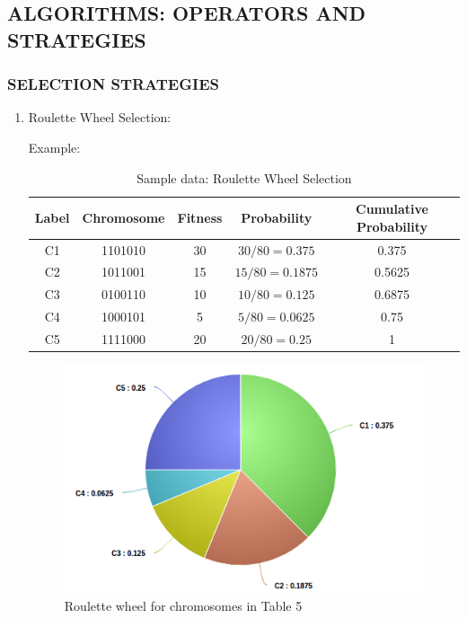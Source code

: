 \documentclass[12pt,a4paper]{article}
\begin{document}
	\subsection{ALGORITHMS: OPERATORS AND STRATEGIES}
	\subsubsection{SELECTION STRATEGIES}	
	\begin{enumerate}
	\item Roulette Wheel Selection: \par
	Example: \\
	\begin{table}[H]
		\centering
		\caption{Sample data: Roulette Wheel Selection}
		\begin{tabular}{ |c|c|c|c|c| }
		\hline
		Label & Chromosome & Fitness & Probability & Cumulative Probability \\
		\hline
		\hline
		C1 & 1101010 & 30 & $30/80=0.375$ & 0.375 \\
		\hline
		C2 & 1011001 & 15 & $15/80=0.1875$ & 0.5625 \\
		\hline
		C3 & 0100110 & 10 & $10/80=0.125$ & 0.6875 \\
		\hline
		C4 & 1000101 & 5 & $5/80=0.0625$ & 0.75 \\
		\hline
		C5 & 1111000 & 20 & $20/80=0.25$ & 1 \\
		\hline
		\end{tabular}
	\end{table}	
	
	\begin{figure}[h]
		\includegraphics[width=\textwidth]{roulette-pie}
		\caption{Roulette wheel for chromosomes in Table 5}
		\centering
	\end{figure}


\end{enumerate}
\end{document}
